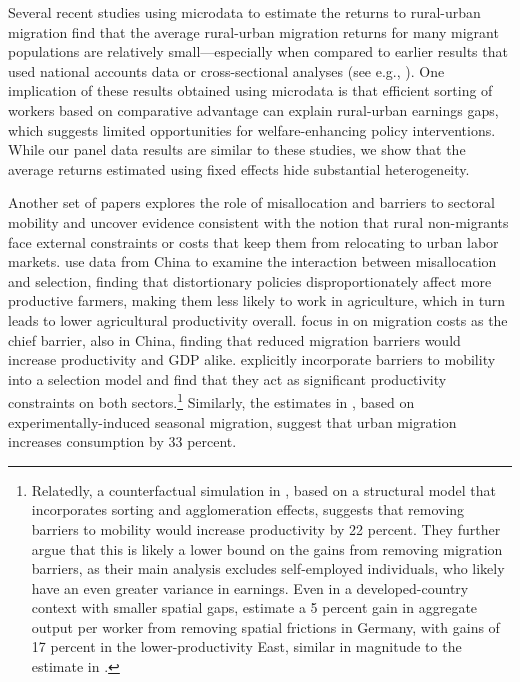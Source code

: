 \documentclass[12pt]{article}
\begin{document}
Several recent studies using microdata to estimate the returns to rural-urban migration \citep{alvarezAgriculturalWageGap2020, hamoryReevaluatingAgriculturalProductivity2021, herrendorfWagesHumanCapital2018} find that the average rural-urban migration returns for many migrant populations are relatively small---especially when compared to earlier results that used national accounts data or cross-sectional analyses (see e.g., \citealt{gollinAgriculturalProductivityGap2014,youngInequalityUrbanRuralGap2013}). 
One implication of these results obtained using microdata is that efficient sorting of workers based on comparative advantage can explain rural-urban earnings gaps, which suggests limited opportunities for welfare-enhancing policy interventions. 
While our panel data results are similar to these studies, we show that the average returns estimated using fixed effects hide substantial heterogeneity.

Another set of papers explores the role of misallocation and barriers to sectoral mobility and uncover evidence consistent with the notion that rural non-migrants face external constraints or costs that keep them from relocating to urban labor markets.
\cite{adamopoulosMisallocationSelectionProductivity2022} use data from China to examine the interaction between misallocation and selection, finding that distortionary policies disproportionately affect more productive farmers, making them less likely to work in agriculture, which in turn leads to lower agricultural productivity overall.
\cite{gaiMigrationCostsSorting2024} focus in on migration costs as the chief barrier, also in China, finding that reduced migration barriers would increase productivity and GDP alike.
\cite{pulidoBarriersMobilitySorting2021} explicitly incorporate barriers to mobility into a selection model and find that they act as significant productivity constraints on both sectors.\footnote{Relatedly, a counterfactual simulation in \cite{bryanAggregateProductivityEffects2019}, based on a structural model that incorporates sorting and agglomeration effects, suggests that removing barriers to mobility would increase productivity by 22 percent. They further argue that this is likely a lower bound on the gains from removing migration barriers, as their main analysis excludes self-employed individuals, who likely have an even greater variance in earnings. Even in a developed-country context with smaller spatial gaps, \cite{heiseLaborMisallocation2023} estimate a 5 percent gain in aggregate output per worker from removing spatial frictions in Germany, with gains of 17 percent in the lower-productivity East, similar in magnitude to the estimate in \citet{bryanAggregateProductivityEffects2019}.}
Similarly, the estimates in \cite{bryanUnderinvestmentProfitableTechnology2014}, based on experimentally-induced seasonal migration, suggest that urban migration increases consumption by 33 percent. 
\end{document}
